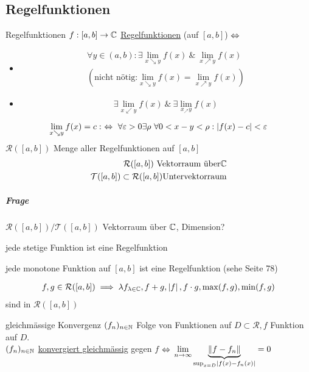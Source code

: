 \subsection{Regelfunktionen}
\begin{Def}{Regelfunktionen}
  $f:[a,b] \to\mathbb{C}$ \underline{Regelfunktionen} (auf $[a,b]$) $\Leftrightarrow$
  \begin{itemize}
    \item 
      \begin{align*}
        \forall y\in(a,b):\exists \lim_{x\searrow y}f(x)\ \&\ \lim_{x\nearrow y} f(x)\\
        (\text{nicht nötig:} \lim_{x\searrow y} f(x) = \lim_{x\nearrow y}f(x))
      \end{align*}
    \item \[\exists \lim_{x\swarrow y} f(x)\ \&\ \exists \lim_{x_\nearrow y} f(x)\]
  \end{itemize}
\end{Def}
\begin{Bem}
  \[\lim_{x\searrow y} f(x)=c:\ \Lra\ \forall \varepsilon > 0 \exists \rho\ \forall 0<x-y<\rho: \Abs{f(x)-c}<\varepsilon\]
  $\mathcal{R}([a,b])$ Menge aller Regelfunktionen auf $[a,b]$
  \begin{align*}
    \mathcal{R}([a,b])\ \text{Vektorraum über} \mathbb{C}\\
    \mathcal{T}([a,b])\subset \mathcal{R}([a,b]) \text{Untervektorraum}
  \end{align*}
  \subparagraph{Frage}$\mathcal{R}([a,b])/\mathcal{T}([a,b])$ Vektorraum über $\mathbb{C}$, Dimension?
\end{Bem}
\begin{Bsp}
  jede stetige Funktion ist eine Regelfunktion
\end{Bsp}
\begin{Bsp}
  jede monotone Funktion auf $[a,b]$ ist eine Regelfunktion (sehe Seite 78)
\end{Bsp}
\begin{Bem}
  \begin{align*}
    f,g\in \mathcal{R}([a,b])\implies \lambda f_{\lambda\in\mathbb{C}}, f+g, \left| f \right|, f\cdot g, \max(f,g), \min(f,g)
  \end{align*}
  sind in $\mathcal{R}([a,b])$
\end{Bem}
\begin{Def}{gleichmässige Konvergenz}
  $(f_n)_{n\in\mathbb{N}}$ Folge von Funktionen auf $D\subset \mathcal{R}, f$ Funktion auf $D$.\\
  $(f_n)_{n\in\mathbb{N}}$ \underline{konvergiert gleichmässig} gegen $f$ $\Leftrightarrow$ $\displaystyle\lim_{n\rightarrow\infty} \underbrace{\left\| f-f_n \right\|}_{\sup_{x=D}\left| f(x)-f_n(x) \right|}=0$
\end{Def}
